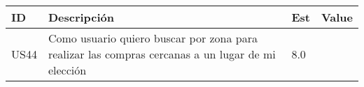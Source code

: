 \documentclass[a4paper,8pt]{article}
\begin{document}
\begin{tabular}{|p{1cm}|p{10cm}|p{1cm}|p{1cm}|}
\hline
\hline
\textbf{ID}&\textbf{Descripción}&\textbf{Est}&\textbf{Value}\\
\hline
\hline
US44 &	Como usuario quiero buscar por zona para realizar las compras cercanas a un lugar de mi elección &	8.0 	 &\\
\hline
\hline
\hline
\hline
\hline
\hline
\hline
\hline	
\hline
\hline	
\hline
\hline

\end{tabular}
\end{document}
